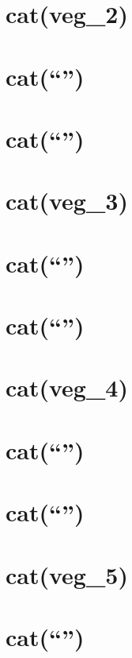 \documentclass[]{article}
\begin{document}
\section{cat(veg\_2)}\label{catveg_2}

\section{\texorpdfstring{cat(``\n'')}{cat()}}\label{cat-19}

\section{\texorpdfstring{cat(``\n'')}{cat()}}\label{cat-20}

\section{cat(veg\_3)}\label{catveg_3}

\section{\texorpdfstring{cat(``\n'')}{cat()}}\label{cat-21}

\section{\texorpdfstring{cat(``\n'')}{cat()}}\label{cat-22}

\section{cat(veg\_4)}\label{catveg_4}

\section{\texorpdfstring{cat(``\n'')}{cat()}}\label{cat-23}

\section{\texorpdfstring{cat(``\n'')}{cat()}}\label{cat-24}

\section{cat(veg\_5)}\label{catveg_5}

\section{\texorpdfstring{cat(``\n'')}{cat()}}\label{cat-25}
\end{document}
